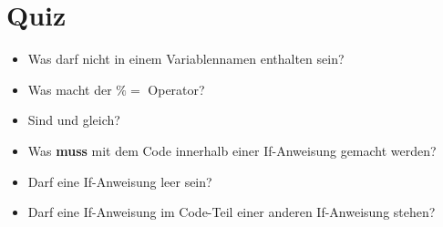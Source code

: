 \livecoding

\section{Quiz}
\begin{frame}
    \slidehead
    \begin{itemize}
        \item Was darf nicht in einem Variablennamen enthalten sein?
            \pause
        \item Was macht der \textbf{$\%=$} Operator?%
            \pause
        \item Sind \pythoninline{=} und \pythoninline{==} gleich?
            \pause
        \item Was \textbf{muss} mit dem Code innerhalb einer If-Anweisung gemacht werden?
            \pause
        \item Darf eine If-Anweisung leer sein?
            \pause
        \item Darf eine If-Anweisung im Code-Teil einer anderen If-Anweisung stehen?
    \end{itemize}
\end{frame}





